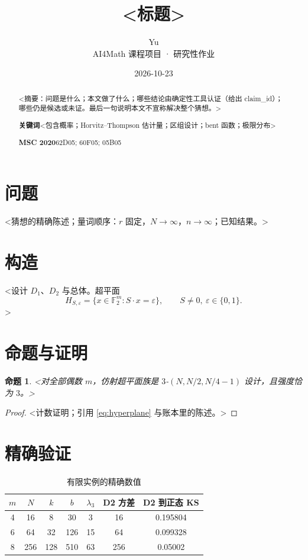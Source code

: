 \documentclass[10pt,a4paper]{article}
\title{<标题>}
\author{Yu\\[2pt]{\small AI4Math 课程项目 · 研究性作业}}
\date{2026-10-23}
\theoremstyle{plain}
\newtheorem{proposition}[theorem]{命题}
\theoremstyle{definition}
\begin{document}
\maketitle

\begin{abstract}
\noindent <摘要：问题是什么；本文做了什么；哪些结论由确定性工具认证（给出 claim\_id）；哪些仍是候选或未证。最后一句说明本文不宣称解决整个猜想。>

\medskip
\noindent\textbf{关键词}\quad <包含概率；Horvitz--Thompson 估计量；区组设计；bent 函数；极限分布>

\noindent\textbf{MSC 2020}\quad 62D05; 60F05; 05B05
\end{abstract}

\section{问题}
<猜想的精确陈述；量词顺序：$r$ 固定，$N\to\infty$，$n\to\infty$；已知结果。>

\section{构造}
<设计 $D_1$、$D_2$ 与总体。超平面
\begin{equation}\label{eq:hyperplane}
  H_{S,\varepsilon} = \{x \in \mathbb{F}_2^m : S\cdot x = \varepsilon\},
  \qquad S \neq 0,\ \varepsilon \in \{0,1\}.
\end{equation}
>

\section{命题与证明}
\begin{proposition}\label{prop:strength}
<对全部偶数 $m$，仿射超平面族是 $3$-$(N, N/2, N/4-1)$ 设计，且强度恰为 $3$。>
\end{proposition}
\begin{proof}
<计数证明；引用 \eqref{eq:hyperplane} 与账本里的陈述。>
\end{proof}

\section{精确验证}
\begin{table}[htbp]
  \centering
  \caption{有限实例的精确数值}
  \label{tab:instances}
  \begin{tabular}{@{}ccccccc@{}}
    \toprule
    $m$ & $N$ & $k$ & $b$ & $\lambda_3$ & D2 方差 & D2 到正态 KS \\
    \midrule
    4 & 16 & 8 & 30 & 3 & 16 & 0.195804 \\
    6 & 64 & 32 & 126 & 15 & 64 & 0.099328 \\
    8 & 256 & 128 & 510 & 63 & 256 & 0.05002 \\
    \bottomrule
  \end{tabular}
\end{table}
\end{document}
